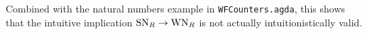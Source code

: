 Combined with the natural numbers example in \texttt{WFCounters.agda}, this shows
that the intuitive implication $\mathrm{SN}_R \to \mathrm{WN}_R$ is not actually intuitionistically valid.

%
%

%
%
